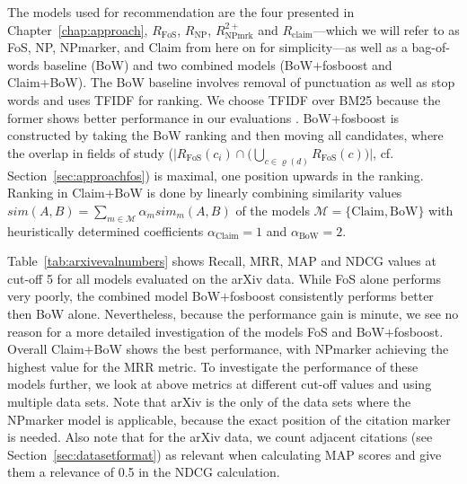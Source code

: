 The models used for recommendation are the four presented in Chapter~\ref{chap:approach}, ${R_{\text{FoS}}}$, ${R_{\text{NP}}}$, ${R_{\text{NPmrk}}^{2+}}$ and $R_{\text{claim}}$---which we will refer to as FoS, NP, NPmarker, and Claim from here on for simplicity---as well as a bag-of-words baseline (BoW) and two combined models (BoW+fosboost and Claim+BoW). The BoW baseline involves removal of punctuation as well as stop words and uses TFIDF for ranking. We choose TFIDF over BM25 because the former shows better performance in our evaluations%
. BoW+fosboost is constructed by taking the BoW ranking and then moving all candidates, where the overlap in fields of study (${\big|R_{\text{FoS}}(c_i)\cap\big(\bigcup\limits_{c \in \varrho(d)} R_{\text{FoS}}(c)\big)\big|}$, cf. Section~\ref{sec:approachfos}) is maximal, one position upwards in the ranking. Ranking in Claim+BoW is done by linearly combining similarity values $sim(A,B)=\sum\limits_{m\in\mathcal{M}}\alpha_msim_m(A,B)$ of the models $\mathcal{M}=\{\text{Claim},\text{BoW}\}$ with heuristically determined coefficients $\alpha_{\text{Claim}}=1$ and $\alpha_{\text{BoW}}=2$.

Table~\ref{tab:arxivevalnumbers} shows Recall, MRR, MAP and NDCG values at cut-off 5 for all models evaluated on the arXiv data. While FoS alone performs very poorly, the combined model BoW+fosboost consistently performs better then BoW alone. Nevertheless, because the performance gain is minute, we see no reason for a more detailed investigation of the models FoS and BoW+fosboost. Overall Claim+BoW shows the best performance, with NPmarker achieving the highest value for the MRR metric. To investigate the performance of these models further, we look at above metrics at different cut-off values and using multiple data sets. Note that arXiv is the only of the data sets where the NPmarker model is applicable, because the exact position of the citation marker is needed. Also note that for the arXiv data, we count adjacent citations (see Section~\ref{sec:datasetformat}) as relevant when calculating MAP scores and give them a relevance of 0.5 in the NDCG calculation.


